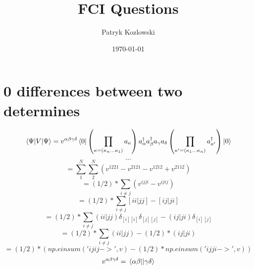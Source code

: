 \documentclass[12pt]{article}
\title{FCI Questions}
\author{Patryk Kozlowski}
\date{\today} %
\begin{document}
\maketitle
\section{0 differences between two determines}
\begin{equation}
    \mel{\Psi }{V}{\Psi }
    =v^{\alpha\beta\gamma\delta}\bra{0}\left(\prod_{\kappa=\left(\kappa_{n}\dots\kappa_{1}\right)}a_{\kappa}\right)
        a^{\dag}_{\alpha  }a^{\dag}_{\beta }a_{\gamma }a_{\delta }
    \left(\prod_{\kappa^{\prime}=\left(\kappa_{1}\dots\kappa_{n}\right)}a^{\dag}_{\kappa^{\prime}}\right)\ket{0}
\end{equation}
\begin{equation}
    ...
\end{equation}
\begin{equation}
    =\sum_{1}^{N} \sum_{2}^{N} \left(v^{1221}-v^{2121}-v^{1212}+v^{2112}\right)
\end{equation}
\begin{equation}
    =(1/2)*\sum_{i\neq j} (v^{ijji}-v^{ijij})
\end{equation}
\begin{equation}
    =(1/2)*\sum_{i\neq j} [ii|jj]-[ij|ji]
\end{equation}
\begin{equation}
    =(1/2)*\sum_{i\neq j} (ii|jj)\delta _{[i][i]}\delta _{[j][j]}-(ij|ji)\delta _{[i][j]}
\end{equation}
\begin{equation}
    =(1/2)*\sum_{i\neq j} (ii|jj)-(1/2)*(ij|ji)
\end{equation}
\begin{equation}
    =(1/2)*(np.einsum('ijij->',v)-(1/2)*np.einsum('ijji->',v))
\end{equation}
\begin{equation}
    v^{\alpha \beta \gamma  \delta }=\mel{\alpha \beta }{}{\gamma \delta }
\end{equation}
\end{document}
